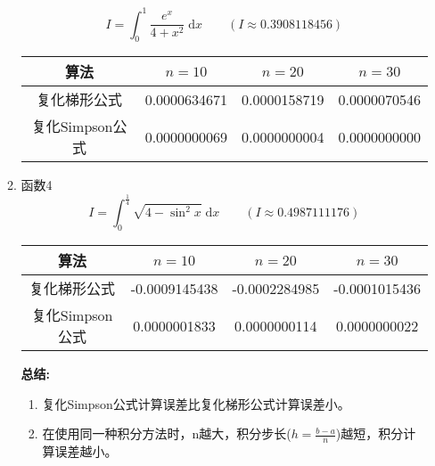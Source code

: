 \documentclass[a4paper,11pt]{article}
\begin{document}
\begin{enumerate}
\begin{enumerate}[(1)]
\begin{displaymath}
				I=\int_{0}^{1}\frac{e^{x}}{4+x^2}\;\mathrm{d}x\qquad(I\approx{}0.3908118456)
			\end{displaymath}
			\begin{center}
				\begin{tabular}{|c|c|c|c|}
					\hline
					算法 & $n=10$ & $n=20$ & $n=30$\\
					\hline 
					复化梯形公式 & 0.0000634671 & 0.0000158719 & 0.0000070546 \\
					\hline
					复化Simpson公式 & 0.0000000069 & 0.0000000004 & 0.0000000000 \\
					\hline
				\end{tabular}
			\end{center}
		\item 函数4
			\begin{displaymath}
				I=\int_{0}^{\frac{1}{4}}\sqrt{4-\sin^{2}{x}}\;\mathrm{d}x\qquad(I\approx{}0.4987111176)
			\end{displaymath}
			\begin{center}
				\begin{tabular}{|c|c|c|c|}
					\hline
					算法 & $n=10$ & $n=20$ & $n=30$\\
					\hline 
					复化梯形公式 & -0.0009145438 & -0.0002284985 & -0.0001015436 \\
					\hline
					复化Simpson公式 & 0.0000001833 & 0.0000000114 & 0.0000000022 \\
					\hline
				\end{tabular}
			\end{center}
		\textbf{总结:}
			\begin{enumerate}[1)]
				\item 复化Simpson公式计算误差比复化梯形公式计算误差小。
				\item 在使用同一种积分方法时，n越大，积分步长($h=\frac{b-a}{n}$)越短，积分计算误差越小。
			\end{enumerate}
	\end{enumerate}


\end{enumerate}
\end{document}
